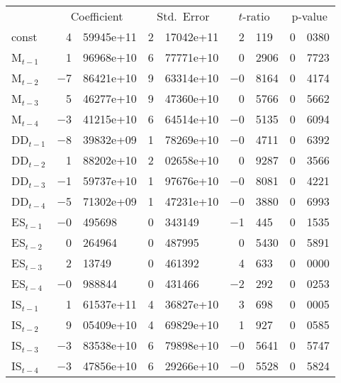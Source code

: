 \documentclass[11pt]{article}
\begin{document}
\begin{center}
\begin{tabular}{lr@{.}lr@{.}lr@{.}lr@{.}l}
  &
 \multicolumn{2}{c}{Coefficient} &
  \multicolumn{2}{c}{Std.\ Error} &
   \multicolumn{2}{c}{$t$-ratio} &
    \multicolumn{2}{c}{p-value} \\[1ex]
const &
  4&59945\textrm{e+11} &
    2&17042\textrm{e+11} &
      2&119 &
        0&0380 \\
M$_{t-1}$ &
  1&96968\textrm{e+10} &
    6&77771\textrm{e+10} &
      0&2906 &
        0&7723 \\
M$_{t-2}$ &
  $-$7&86421\textrm{e+10} &
    9&63314\textrm{e+10} &
      $-$0&8164 &
        0&4174 \\
M$_{t-3}$ &
  5&46277\textrm{e+10} &
    9&47360\textrm{e+10} &
      0&5766 &
        0&5662 \\
M$_{t-4}$ &
  $-$3&41215\textrm{e+10} &
    6&64514\textrm{e+10} &
      $-$0&5135 &
        0&6094 \\
DD$_{t-1}$ &
  $-$8&39832\textrm{e+09} &
    1&78269\textrm{e+10} &
      $-$0&4711 &
        0&6392 \\
DD$_{t-2}$ &
  1&88202\textrm{e+10} &
    2&02658\textrm{e+10} &
      0&9287 &
        0&3566 \\
DD$_{t-3}$ &
  $-$1&59737\textrm{e+10} &
    1&97676\textrm{e+10} &
      $-$0&8081 &
        0&4221 \\
DD$_{t-4}$ &
  $-$5&71302\textrm{e+09} &
    1&47231\textrm{e+10} &
      $-$0&3880 &
        0&6993 \\
ES$_{t-1}$ &
  $-$0&495698 &
    0&343149 &
      $-$1&445 &
        0&1535 \\
ES$_{t-2}$ &
  0&264964 &
    0&487995 &
      0&5430 &
        0&5891 \\
ES$_{t-3}$ &
  2&13749 &
    0&461392 &
      4&633 &
        0&0000 \\
ES$_{t-4}$ &
  $-$0&988844 &
    0&431466 &
      $-$2&292 &
        0&0253 \\
IS$_{t-1}$ &
  1&61537\textrm{e+11} &
    4&36827\textrm{e+10} &
      3&698 &
        0&0005 \\
IS$_{t-2}$ &
  9&05409\textrm{e+10} &
    4&69829\textrm{e+10} &
      1&927 &
        0&0585 \\
IS$_{t-3}$ &
  $-$3&83538\textrm{e+10} &
    6&79898\textrm{e+10} &
      $-$0&5641 &
        0&5747 \\
IS$_{t-4}$ &
  $-$3&47856\textrm{e+10} &
    6&29266\textrm{e+10} &
      $-$0&5528 &
        0&5824 \\
\end{tabular}


\end{center}
\end{document}
